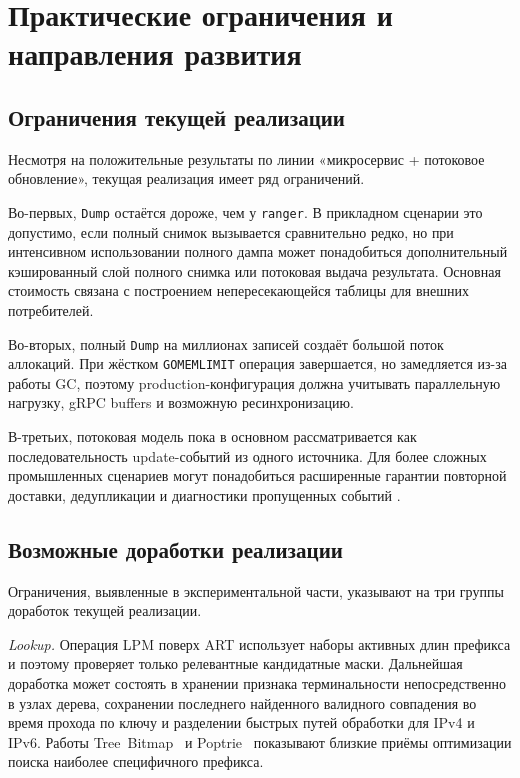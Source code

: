 \section{Практические ограничения и направления развития}
\label{sec:limitations}

\subsection{Ограничения текущей реализации}

Несмотря на положительные результаты по линии «микросервис + потоковое
обновление», текущая реализация имеет ряд ограничений.

Во-первых, \texttt{Dump} остаётся дороже, чем у \texttt{ranger}. В прикладном
сценарии это допустимо, если полный снимок вызывается сравнительно
редко, но при интенсивном использовании полного дампа может
понадобиться дополнительный кэшированный слой полного снимка или
потоковая выдача результата. Основная стоимость связана с построением
непересекающейся таблицы для внешних потребителей.

Во-вторых, полный \texttt{Dump} на миллионах записей создаёт большой
поток аллокаций. При жёстком \texttt{GOMEMLIMIT} операция завершается,
но замедляется из-за работы GC, поэтому production-конфигурация должна
учитывать параллельную нагрузку, gRPC buffers и возможную ресинхронизацию.

В-третьих, потоковая модель пока в основном рассматривается как
последовательность update-событий из одного источника. Для более
сложных промышленных сценариев могут понадобиться расширенные гарантии
повторной доставки, дедупликации и диагностики пропущенных событий
\cite{kreps2011kafka,kleppmann2017ddia}.

\subsection{Возможные доработки реализации}

Ограничения, выявленные в экспериментальной части, указывают на три
группы доработок текущей реализации.

\textit{Lookup.} Операция LPM поверх ART использует наборы активных длин
префикса и поэтому проверяет только релевантные кандидатные маски.
Дальнейшая доработка может состоять в хранении признака терминальности
непосредственно в узлах дерева, сохранении последнего найденного
валидного совпадения во время прохода по ключу и разделении быстрых путей
обработки для IPv4 и IPv6. Работы
Tree~Bitmap~\cite{eatherton2004treebitmap} и
Poptrie~\cite{asai2015poptrie} показывают близкие приёмы оптимизации
поиска наиболее специфичного префикса.

